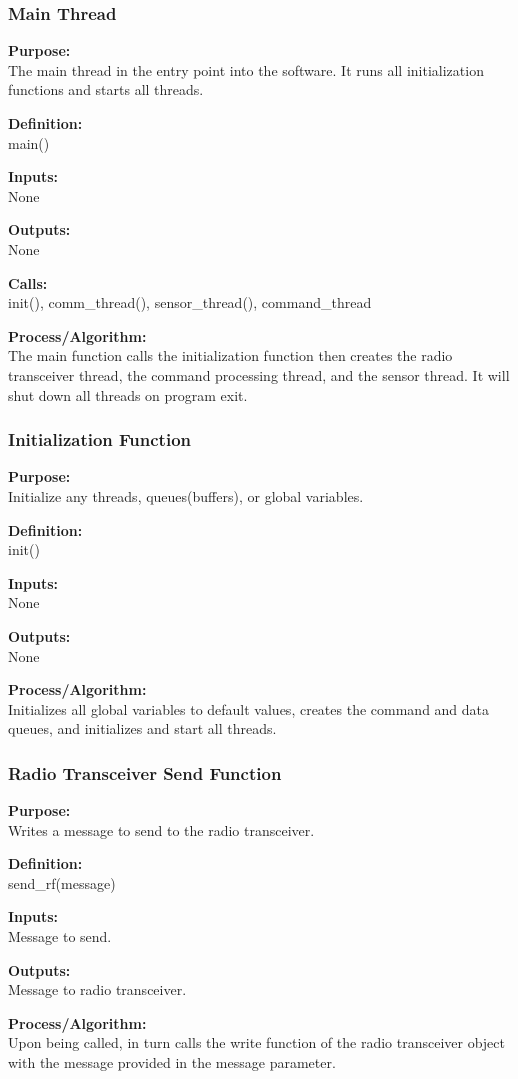 \documentclass[10pt,draftclsnofoot,onecolumn,compsoc]{IEEEtran}
\begin{document}
\subsubsection{Main Thread}
{\bf Purpose:} \\
The main thread in the entry point into the software. It runs all initialization functions and starts all threads. \par
{\bf Definition:} \\ 
main() \par
{\bf Inputs:} \\  None \par
{\bf Outputs:} \\ None \par
{\bf Calls:} \\ init(), comm\_thread(), sensor\_thread(), command\_thread \par
{\bf Process/Algorithm:} \\
The main function calls the initialization function then creates the radio transceiver thread, the command processing thread, and the sensor thread. It will shut down all threads on program exit. \par
\subsubsection{Initialization Function}
{\bf Purpose:} \\
Initialize any threads, queues(buffers), or global variables. \par
{\bf Definition:} \\ 
init() \par
{\bf Inputs:} \\  None \par
{\bf Outputs:} \\ None \par
{\bf Process/Algorithm:} \\
Initializes all global variables to default values, creates the command and data queues, and initializes and start all threads. \par

\subsubsection{Radio Transceiver Send Function}
{\bf Purpose:} \\
Writes a message to send to the radio transceiver. \par
{\bf Definition:} \\ 
send\_rf(message) \par
{\bf Inputs:} \\  Message to send. \par
{\bf Outputs:} \\ Message to radio transceiver. \par
{\bf Process/Algorithm:} \\
Upon being called, in turn calls the write function of the radio transceiver object with the message provided in the message parameter. 
\end{document}
